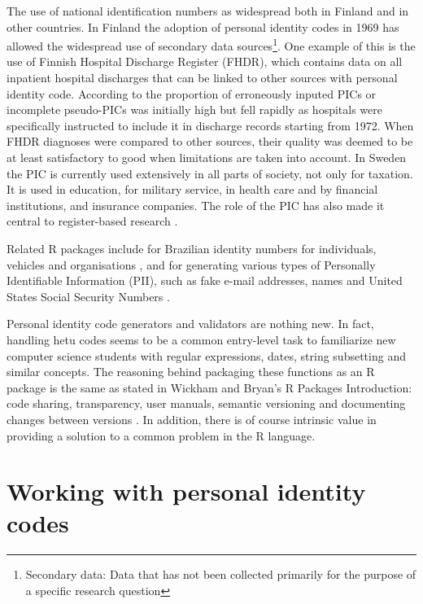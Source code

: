 The use of national identification numbers as widespread both in Finland and in other countries. In Finland the adoption of personal identity codes in 1969 has allowed the widespread use of secondary data sources\footnote{Secondary data: Data that has not been collected primarily for the purpose of a specific research question}. One example of this is the use of Finnish Hospital Discharge Register (FHDR), which contains data on all inpatient hospital discharges that can be linked to other sources with personal identity code. According to \citet{reijosund2012} the proportion of erroneously inputed PICs or incomplete pseudo-PICs was initially high but fell rapidly as hospitals were specifically instructed to include it in discharge records starting from 1972. When FHDR diagnoses were compared to other sources, their quality was deemed to be at least satisfactory to good when limitations are taken into account. In Sweden the PIC is currently used extensively in all parts of society, not only for taxation. It is used in education, for military service, in health care and by financial institutions, and insurance companies. The role of the PIC has also made it central to register-based research \citep{scb2016}.


Related R packages include  for Brazilian identity numbers for individuals, vehicles and organisations \citep{numbersbr}, and  for generating various types of Personally Identifiable Information (PII), such as fake e-mail addresses, names and United States Social Security Numbers \citep{generator}.

Personal identity code generators and validators are nothing new. In fact, handling hetu codes seems to be a common entry-level task to familiarize new computer science students with regular expressions, dates, string subsetting and similar concepts. The reasoning behind packaging these functions as an R package is the same as stated in Wickham and Bryan's R Packages Introduction: code sharing, transparency, user manuals, semantic versioning and documenting changes between versions \citep{wickham}. In addition, there is of course intrinsic value in providing a solution to a common problem in the R language.

\section{Working with personal identity codes}

